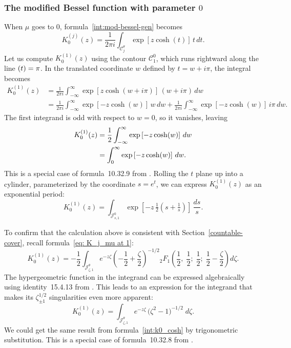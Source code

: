 \documentclass{article}
\let\Im\relax
\DeclareMathOperator{\Im}{Im}
\theoremstyle{definition}
\theoremstyle{plain}
\begin{document}
\subsubsection{The modified Bessel function with parameter $0$}\label{sec:bessel-0}
When $\mu$ goes to $0$, formula~\eqref{int:mod-bessel-gen} becomes
\[ K_0^{(j)}(z) = \frac{1}{2\pi i} \int_{\mathcal{C}_j^\theta} \exp\left[z \cosh(t)\right]\,t\,dt. \]
Let us compute $K^{(1)}_{0}(z)$ using the contour $\mathcal{C}_1^0$, which runs rightward along the line $\Im(t) = \pi$. In the translated coordinate $w$ defined by $t = w + i\pi$, the integral becomes
\begin{align*}
K_0^{(1)}(z) & = \frac{1}{2\pi i} \int_{-\infty}^\infty \exp\left[z \cosh(w + i\pi)\right]\,(w + i\pi)\,dw \\
& = \frac{1}{2\pi i} \int_{-\infty}^\infty \exp\left[-z \cosh(w)\right]\,w\,dw + \frac{1}{2\pi i} \int_{-\infty}^\infty \exp\left[-z \cosh(w)\right]\,i\pi\,dw.
\end{align*}
The first integrand is odd with respect to $w = 0$, so it vanishes, leaving
\begin{align}
K_0^{(1)}(z) & = \frac{1}{2} \int_{-\infty}^\infty \exp\left[-z \cosh(w)\right]\,dw \notag \\
& = \int_0^\infty \exp\left[-z \cosh(w)\right]\,dw. \label{int:k0_cosh}
\end{align}
This is a special case of formula~10.32.9 from \cite{dlmf}. Rolling the $t$ plane up into a cylinder, parameterized by the coordinate $s = e^t$, we can express $K_0^{(1)}(z)$ as an exponential period:
\[ K_0^{(1)}(z) = \int_{\mathcal{J}^0_{s, 1}} \exp\left[-z\,\tfrac{1}{2}\left(s + \tfrac{1}{s}\right)\right]\,\frac{ds}{s}. \]

To confirm that the calculation above is consistent with Section~\ref{countable-cover}, recall formula~\eqref{eq: K_j_mu at 1}:
\[ K_0^{(1)}(z) = -\frac{1}{2} \int_{\mathcal{J}^\theta_{\zeta, 1}} e^{-z\zeta} \left(-\frac{1}{2}+\frac{\zeta}{2}\right)^{-1/2} {}_2F_1\left(\frac{1}{2},\;\frac{1}{2};\;\frac{1}{2};\;\frac{1}{2} - \frac{\zeta}{2}\right) d\zeta. \]
The hypergeometric function in the integrand can be expressed algebraically using identity~15.4.13 from \cite{dlmf}. This leads to an expression for the integrand that makes its $\zeta_{\pm 1}^{1/2}$ singularities even more apparent:
\begin{equation}\label{eqn:borel_bessel0}
K_0^{(1)}(z) = \int_{\mathcal{J}^\theta_{\zeta, 1}} e^{-z\zeta}\,\big(\zeta^2 - 1\big)^{-1/2}\;d\zeta.
\end{equation}
We could get the same result from formula~\eqref{int:k0_cosh} by trigonometric substitution. This is a special case of formula~10.32.8 from \cite{dlmf}.
%
\end{document}

